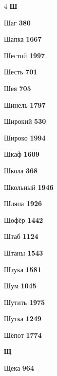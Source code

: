\begin{multicols}{4}
\vspace{0.6em}\noindent\textbf{\normalsize\sffamily\color{primary} Ш}\par\vspace{0.2em}
\noindent Шаг \dotfill \textbf{\color{secondary} 380}\par
\noindent Шапка \dotfill \textbf{\color{secondary} 1667}\par
\noindent Шестой \dotfill \textbf{\color{secondary} 1997}\par
\noindent Шесть \dotfill \textbf{\color{secondary} 701}\par
\noindent Шея \dotfill \textbf{\color{secondary} 705}\par
\noindent Шинель \dotfill \textbf{\color{secondary} 1797}\par
\noindent Широкий \dotfill \textbf{\color{secondary} 530}\par
\noindent Широко \dotfill \textbf{\color{secondary} 1994}\par
\noindent Шкаф \dotfill \textbf{\color{secondary} 1609}\par
\noindent Школа \dotfill \textbf{\color{secondary} 368}\par
\noindent Школьный \dotfill \textbf{\color{secondary} 1946}\par
\noindent Шляпа \dotfill \textbf{\color{secondary} 1926}\par
\noindent Шофёр \dotfill \textbf{\color{secondary} 1442}\par
\noindent Штаб \dotfill \textbf{\color{secondary} 1124}\par
\noindent Штаны \dotfill \textbf{\color{secondary} 1543}\par
\noindent Штука \dotfill \textbf{\color{secondary} 1581}\par
\noindent Шум \dotfill \textbf{\color{secondary} 1045}\par
\noindent Шутить \dotfill \textbf{\color{secondary} 1975}\par
\noindent Шутка \dotfill \textbf{\color{secondary} 1249}\par
\noindent Шёпот \dotfill \textbf{\color{secondary} 1774}\par

\vspace{0.6em}\noindent\textbf{\normalsize\sffamily\color{primary} Щ}\par\vspace{0.2em}
\noindent Щека \dotfill \textbf{\color{secondary} 964}\par


\end{multicols}
